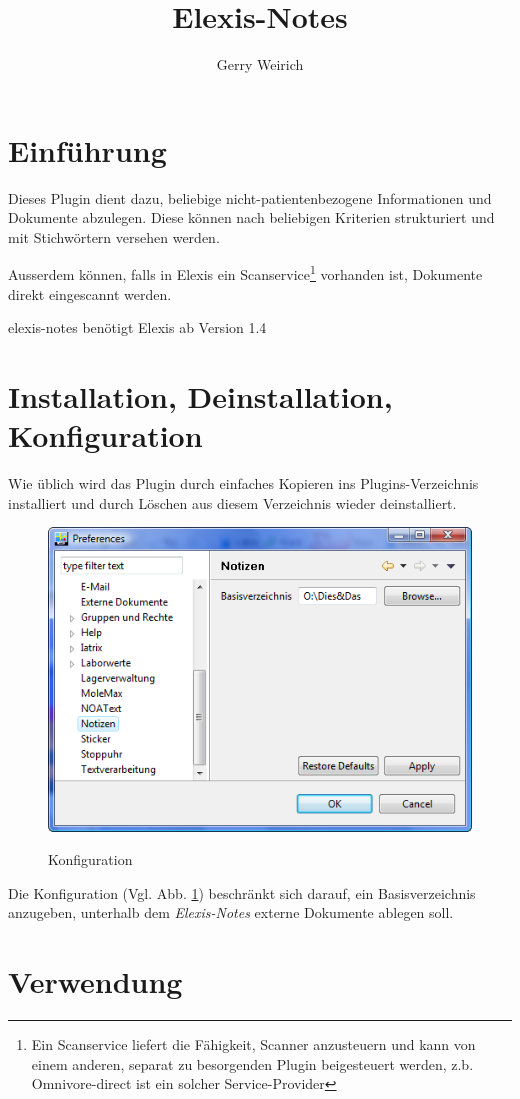 \documentclass[a4paper]{scrartcl}
\begin{document}
\title{Elexis-Notes}
\author{Gerry Weirich}
\maketitle

\section{Einführung}
Dieses Plugin dient dazu, beliebige nicht-patientenbezogene Informationen und Dokumente abzulegen. Diese können nach beliebigen Kriterien strukturiert und mit Stichwörtern versehen werden.

Ausserdem können, falls in Elexis ein Scanservice\footnote{Ein Scanservice liefert die Fähigkeit, Scanner anzusteuern und kann von einem anderen, separat zu besorgenden Plugin beigesteuert werden, z.b. Omnivore-direct ist ein solcher Service-Provider} vorhanden ist, Dokumente direkt eingescannt werden.

\medskip

elexis-notes benötigt Elexis ab Version 1.4

\section{Installation, Deinstallation, Konfiguration}
Wie üblich wird das Plugin durch einfaches Kopieren ins Plugins-Verzeichnis installiert und durch Löschen aus diesem Verzeichnis wieder deinstalliert.

\begin{figure}
  \includegraphics{config}\\
  \caption{Konfiguration}\label{fig:notes1}
\end{figure}

Die Konfiguration (Vgl. Abb. \ref{fig:notes1}) beschränkt sich darauf, ein Basisverzeichnis anzugeben, unterhalb dem  \textit{Elexis-Notes} externe Dokumente ablegen soll.

\section {Verwendung}
\end{document}
